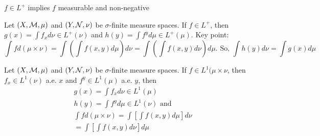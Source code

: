 \begin{rmk}
$f \in L^+ $ implies $f$ measurable and non-negative	
\end{rmk}
\begin{thm}
Let $(X,{\mathcal M}, \mu)$ and $(Y, {\mathcal N}, \nu)$ be $\sigma$-finite measure spaces. 
If $f \in L^+$, then $g(x)=\int f_x d \nu \in L^+(\nu)$ and $h(y)=\int f^y d \mu \in L^+(\mu)$. Key point: 
\[
\int f d (\mu \times \nu)=\int \left( \int f(x,y) d\mu\right)d \nu = \int \left( \int f(x,y) d\nu\right)d \mu. \text{ So, } \int h(y)d\nu=\int g(x) d\mu
\]
\end{thm}
\begin{thm}
Let $(X,{\mathcal M}, \mu)$ and $(Y, {\mathcal N}, \nu)$ be $\sigma$-finite measure spaces. 
If $f\in L^{1}(\mu \times \nu$, then $f_x \in L^1(\nu)$ a.e. $x$ and $f^y \in L^1(\mu)$ a.e. $y$, then
\begin{eqnarray*}
	g(x) = \int f_x d \nu \in L^1 (\mu) \\
	h(y) = \int f^y d \mu \in L^1(\nu) \text{ and} \\
	\int f d(\mu \times \nu)=\int \left[ \int f(x,y)d\mu \right] d \nu \\
	=\int \left[ \int f(x,y) d \nu \right] d \mu 
\end{eqnarray*}
\end{thm}

